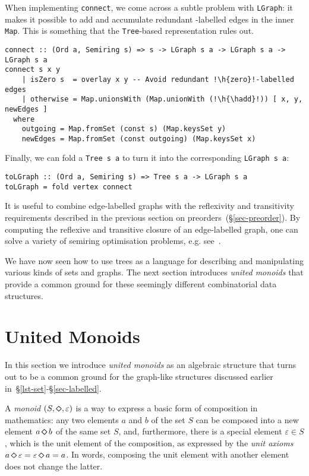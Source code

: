 \documentclass[english,submission]{programming}
\newcommand{\hcode}[1]{{\color{darkblue} \lstinline[keywordstyle={}]|#1|}} %
\newcommand{\h}[1]{{\itshape\color{grayblue}#1}} %
\newcommand{\hadd}{{\large\color{darkblue} $\oplus$}}
\newcommand{\zero}{\raisebox{-0.2mm}{\textcircled{0}}\xspace}
\newcommand{\dia}{\,\text{\raisebox{-0.3mm}{\Large $\diamond$}}\,}
\newcommand{\ldia}{\text{\raisebox{-0.3mm}{\Large $\diamond$}}}
\begin{document}
\noindent
When implementing \hcode{connect}, we come across a subtle problem with
\hcode{LGraph}: it makes it possible to add and accumulate redundant
\zero-labelled edges in the inner \hcode{Map}. This is something that the
\hcode{Tree}-based representation rules out.

\begin{lstlisting}
connect :: (Ord a, Semiring s) => s -> LGraph s a -> LGraph s a -> LGraph s a
connect s x y
    | isZero s  = overlay x y -- Avoid redundant !\h{zero}!-labelled edges
    | otherwise = Map.unionsWith (Map.unionWith (!\h{\hadd}!)) [ x, y, newEdges ]
  where
    outgoing = Map.fromSet (const s) (Map.keysSet y)
    newEdges = Map.fromSet (const outgoing) (Map.keysSet x)
\end{lstlisting}

\noindent
Finally, we can fold a \hcode{Tree s a} to turn it into the corresponding
\hcode{LGraph s a}:

\begin{lstlisting}
toLGraph :: (Ord a, Semiring s) => Tree s a -> LGraph s a
toLGraph = fold vertex connect
\end{lstlisting}

\noindent
It is useful to combine edge-labelled graphs with the reflexivity and
transitivity requirements described in the previous section on
preorders~(\S\ref{sec-preorder}). By computing the reflexive and transitive
closure of an edge-labelled graph, one can solve a variety of semiring
optimisation problems, e.g. see~\cite{2013_semirings_dolan}.

We have now seen how to use trees as a language for describing and manipulating
various kinds of sets and graphs. The next section introduces \emph{united
monoids} that provide a common ground for these seemingly different
combinatorial data structures.

\section{United Monoids}\label{sec-united}

In this section we introduce \emph{united monoids} as an algebraic structure
that turns out to be a common ground for the graph-like structures
discussed earlier in~\S\ref{lst-set}-\S\ref{sec-labelled}.

A \emph{monoid} $(S, \ldia, \varepsilon)$ is a way to express a basic form of
composition in mathematics: any two elements $a$ and $b$ of the set $S$ can be
composed into a new element $a \dia b$ of the same set $S$, and, furthermore,
there is a special element $\varepsilon \in S$, which is the unit element of the
composition, as expressed by the \emph{unit axioms}
$a \dia \varepsilon = \varepsilon \dia a = a$. In words, composing the unit
element with another element does not change the latter.
\end{document}
